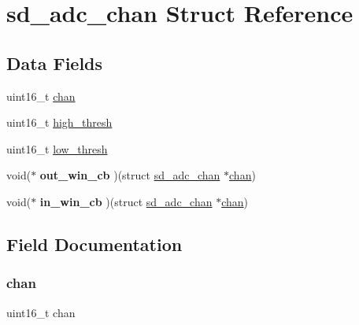 \hypertarget{structsd__adc__chan}{}\section{sd\+\_\+adc\+\_\+chan Struct Reference}
\label{structsd__adc__chan}
\subsection*{Data Fields}
\begin{DoxyCompactItemize}
\item 
uint16\+\_\+t \mbox{\hyperlink{structsd__adc__chan_ab7be689013e9728e79991dfdeb07dd7b}{chan}}
\item 
uint16\+\_\+t \mbox{\hyperlink{structsd__adc__chan_a2de25c524e91cef9584ffc432e4a506e}{high\+\_\+thresh}}
\item 
uint16\+\_\+t \mbox{\hyperlink{structsd__adc__chan_ac99d3c3bccb8932626335a00ec5e325f}{low\+\_\+thresh}}
\item 
\mbox{\label{structsd__adc__chan_ac91c375d6ce0054fbd8e31bed364d3c4}} 
void($\ast$ {\bfseries out\+\_\+win\+\_\+cb} )(struct \mbox{\hyperlink{structsd__adc__chan}{sd\+\_\+adc\+\_\+chan}} $\ast$\mbox{\hyperlink{structsd__adc__chan_ab7be689013e9728e79991dfdeb07dd7b}{chan}})
\item 
\mbox{\label{structsd__adc__chan_ab2a2afbe31bfe4c563db58b67be8df55}} 
void($\ast$ {\bfseries in\+\_\+win\+\_\+cb} )(struct \mbox{\hyperlink{structsd__adc__chan}{sd\+\_\+adc\+\_\+chan}} $\ast$\mbox{\hyperlink{structsd__adc__chan_ab7be689013e9728e79991dfdeb07dd7b}{chan}})
\end{DoxyCompactItemize}


\subsection{Field Documentation}
\mbox{\label{structsd__adc__chan_ab7be689013e9728e79991dfdeb07dd7b}} 
\subsubsection{\texorpdfstring{chan}{chan}}
{\footnotesize\ttfamily uint16\+\_\+t chan}

